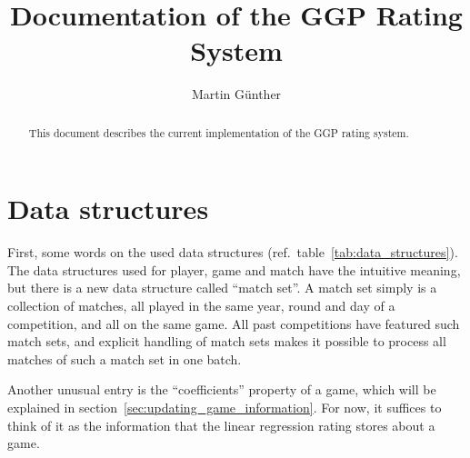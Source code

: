 \documentclass[a4paper,10pt]{article}
\title{Documentation of the GGP Rating System}
\author{Martin Günther}
\begin{document}
\maketitle

\begin{abstract}
This document describes the current implementation of the GGP rating system.
\end{abstract}

\section{Data structures}
First, some words on the used data structures (ref.\ table~\ref{tab:data_structures}).
The data structures used for player, game and match have the intuitive meaning, but there
is a new data structure called ``match set''. A match set simply is a collection of matches,
all played in the same year, round and day of a competition, and all on the same game.
All past competitions have featured such match sets, and explicit handling of match sets
makes it possible to process all matches of such a match set in one batch.

Another unusual entry is the  ``coefficients'' property of a game, which will be explained in section~\ref{sec:updating_game_information}. For now, it suffices to think of it as the information that the linear regression rating stores about a game.
\end{document}
